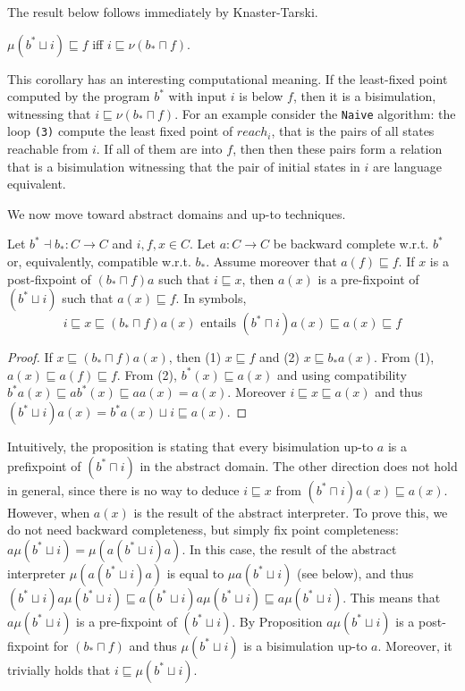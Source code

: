 \documentclass{llncs}
\begin{document}
The result below follows immediately by Knaster-Tarski.

\begin{corollary}
$\mu (b^*\sqcup i)\sqsubseteq f$ iff $i \sqsubseteq \nu (b_*\sqcap f) $.
\end{corollary}

This corollary has an interesting computational meaning. If the least-fixed point computed by the program $b^*$ with input $i$ is below $f$, then it is a bisimulation, witnessing that $i\sqsubseteq  \nu (b_*\sqcap f)$. For an example consider the \texttt{Naive} algorithm:  the loop \texttt{(3)} compute the least fixed point of $reach_i$, that is the pairs of all states reachable from $i$. If all of them are into $f$, then then  these pairs form a relation that is a bisimulation witnessing that the pair of initial states in $i$ are language equivalent.

We now move toward abstract domains and up-to techniques.

\begin{proposition}
Let $b^* \dashv b_* \colon C \to C$ and $i,f,x\in C$. Let $a\colon C\to C$ be backward complete w.r.t. $b^*$ or, equivalently, compatible w.r.t. $b_*$. Assume moreover that $a(f)\sqsubseteq f$. 
%
If $x$ is a post-fixpoint of $(b_*\sqcap f)a$ such that $i\sqsubseteq x$,
then $a(x)$ is a pre-fixpoint of $(b^*\sqcup i)$ such that $a(x)\sqsubseteq f$.
In symbols, 
\begin{equation}
i \sqsubseteq x \sqsubseteq (b_*\sqcap f)a(x)
\text{ entails }
(b^*\sqcap i)a(x)\sqsubseteq a(x)\sqsubseteq f
\end{equation}

\end{proposition}
%
\begin{proof}
%
If $x\sqsubseteq (b_*\sqcap f)a(x)$, then (1) $x\sqsubseteq f$ and (2) $x\sqsubseteq b_*a(x)$. From (1), $a(x)\sqsubseteq a(f)\sqsubseteq f$. From (2), $b^*(x)\sqsubseteq a(x)$ and using compatibility $b^*a(x)\sqsubseteq ab^*(x)\sqsubseteq aa(x) = a(x)$. Moreover $i\sqsubseteq x\sqsubseteq a(x)$ and thus $(b^*\sqcup i)a(x)  = b^*a(x) \sqcup i \sqsubseteq a(x)$.
\end{proof}

Intuitively, the proposition is stating that every bisimulation up-to $a$ is a prefixpoint of $(b^*\sqcap i)$ in the abstract domain.
The other direction does not hold in general, since there is no way to deduce $i\sqsubseteq x$ from $(b^*\sqcap i)a(x)\sqsubseteq a(x)$.
However, when $a(x)$ is the result of the abstract interpreter. To prove this, we do not need backward completeness, but simply fix point completeness: $a\mu (b^*\sqcup i) = \mu(a(b^*\sqcup i)a)$. In this case, the result of the abstract interpreter $\mu(a(b^*\sqcup i)a)$ is equal to 
$\mu a(b^*\sqcup i)$ (see below), and thus $(b^*\sqcup i)a\mu (b^*\sqcup i) \sqsubseteq a(b^*\sqcup i)a\mu (b^*\sqcup i) \sqsubseteq a\mu (b^*\sqcup i)$. This means that $a\mu (b^*\sqcup i)$ is a pre-fixpoint of $(b^*\sqcup i)$. By Proposition \label{prop:correspondencefixedpoints}
 $a\mu (b^*\sqcup i)$ is a post-fixpoint for  $(b_*\sqcap f)$ and thus $\mu (b^*\sqcup i)$ is a bisimulation up-to $a$. Moreover, it trivially holds that $i\sqsubseteq \mu (b^*\sqcup i)$.
 
\end{document}
